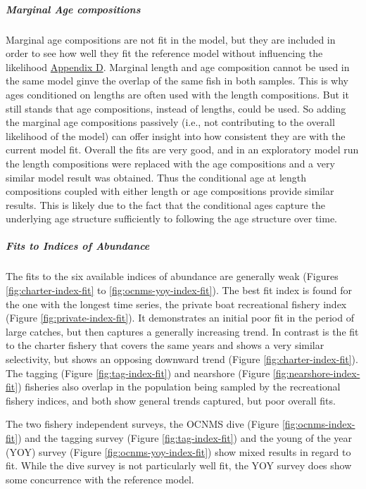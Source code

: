 \documentclass[11pt,
  english,
  letterpaper,
]{article}
\begin{document}
\hypertarget{marginal-age-compositions}{%
\subparagraph{Marginal Age compositions}\label{marginal-age-compositions}}

Marginal age compositions are not fit in the model, but they are included in order to see how well they fit the reference model without influencing the likelihood \protect\hyperlink{app_d}{Appendix D}. Marginal length and age composition cannot be used in the same model ginve the overlap of the same fish in both samples. This is why ages conditioned on lengths are often used with the length compositions. But it still stands that age compositions, instead of lengths, could be used. So adding the marginal age compositions passively (i.e., not contributing to the overall likelihood of the model) can offer insight into how consistent they are with the current model fit. Overall the fits are very good, and in an exploratory model run the length compositions were replaced with the age compositions and a very similar model result was obtained. Thus the conditional age at length compositions coupled with either length or age compositions provide similar results. This is likely due to the fact that the conditional ages capture the underlying age structure sufficiently to following the age structure over time.

\hypertarget{fits-to-indices-of-abundance}{%
\subparagraph{Fits to Indices of Abundance}\label{fits-to-indices-of-abundance}}

The fits to the six available indices of abundance are generally weak (Figures \ref{fig:charter-index-fit} to \ref{fig:ocnms-yoy-index-fit}). The best fit index is found for the one with the longest time series, the private boat recreational fishery index (Figure \ref{fig:private-index-fit}). It demonstrates an initial poor fit in the period of large catches, but then captures a generally increasing trend. In contrast is the fit to the charter fishery that covers the same years and shows a very similar selectivity, but shows an opposing downward trend (Figure \ref{fig:charter-index-fit}). The tagging (Figure \ref{fig:tag-index-fit}) and nearshore (Figure \ref{fig:nearshore-index-fit}) fisheries also overlap in the population being sampled by the recreational fishery indices, and both show general trends captured, but poor overall fits.

The two fishery independent surveys, the OCNMS dive (Figure \ref{fig:ocnms-index-fit}) and the tagging survey (Figure \ref{fig:tag-index-fit}) and the young of the year (YOY) survey (Figure \ref{fig:ocnms-yoy-index-fit}) show mixed results in regard to fit. While the dive survey is not particularly well fit, the YOY survey does show some concurrence with the reference model.
\end{document}
